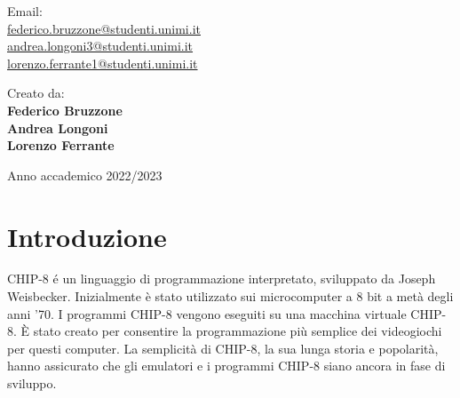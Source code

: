 \documentclass[a4paper]{article}
\begin{document}
\begin{titlepage}
\begin{center}
        \begin{minipage}[t]{0.47\textwidth}
	       {Email: } \vspace{0.3em} \\
              {\large \href{federico.bruzzone@studenti.unimi.it}{federico.bruzzone@studenti.unimi.it}} \vspace{1em}  \\
              {\large \href{andrea.longoni3@studenti.unimi.it}{andrea.longoni3@studenti.unimi.it}} \vspace{1em}  \\
              {\large \href{lorenzo.ferrante1@studenti.unimi.it}{lorenzo.ferrante1@studenti.unimi.it}} \vspace{1em}  \\
        \end{minipage}
        \hfill
        \begin{minipage}[t]{0.47\textwidth}\raggedleft
	       {Creato da:} \hspace{-0.9em} \vspace{0.3em} \\
              {\large \textbf{Federico Bruzzone}} \\
              \vspace{1em}
              {\large \textbf{Andrea Longoni}} \\
              \vspace{1em}
              {\large \textbf{Lorenzo Ferrante}} %
        \end{minipage}

        \vfill
        Anno accademico 2022/2023
            
    \end{center}
\end{titlepage}


\setlength{\parindent}{0pt}
\setlength{\parskip}{0.8em}




\section{Introduzione}

CHIP-8 é un linguaggio di programmazione interpretato, sviluppato da Joseph Weisbecker. Inizialmente è stato utilizzato sui microcomputer a 8 bit a metà degli anni '70. I programmi CHIP-8 vengono eseguiti su una macchina virtuale CHIP-8. È stato creato per consentire la programmazione più semplice dei videogiochi per questi computer. La semplicità di CHIP-8, la sua lunga storia e popolarità, hanno assicurato che gli emulatori e i programmi CHIP-8 siano ancora in fase di sviluppo.
\end{document}
